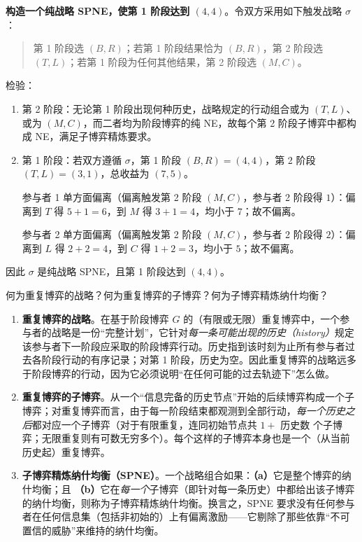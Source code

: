 \textbf{构造一个纯战略 SPNE，使第 1 阶段达到 $(4,4)$}。令双方采用如下触发战略 $\sigma$：
\begin{quote}
第 1 阶段选 $(B,R)$；若第 1 阶段结果恰为 $(B,R)$，第 2 阶段选 $(T,L)$；若第 1 阶段为任何其他结果，第 2 阶段选 $(M,C)$。
\end{quote}
检验：
\begin{enumerate}[leftmargin=*,label=(\roman*)]
  \item 第 2 阶段：无论第 1 阶段出现何种历史，战略规定的行动组合或为 $(T,L)$、或为 $(M,C)$，而二者均为阶段博弈的纯 NE，故每个第 2 阶段子博弈中都构成 NE，满足子博弈精炼要求。
  \item 第 1 阶段：若双方遵循 $\sigma$，第 1 阶段 $(B,R)=(4,4)$，第 2 阶段 $(T,L)=(3,1)$，总收益为 $(7,5)$。

  参与者 1 单方面偏离（偏离触发第 2 阶段 $(M,C)$，参与者 2 阶段得 $1$）：偏离到 $T$ 得 $5+1=6$，到 $M$ 得 $3+1=4$，均小于 $7$；故不偏离。

  参与者 2 单方面偏离（偏离触发第 2 阶段 $(M,C)$，参与者 2 阶段得 $2$）：偏离到 $L$ 得 $2+2=4$，到 $C$ 得 $1+2=3$，均小于 $5$；故不偏离。
\end{enumerate}
因此 $\sigma$ 是纯战略 SPNE，且第 1 阶段达到 $(4,4)$。


何为重复博弈的战略？何为重复博弈的子博弈？何为子博弈精炼纳什均衡？

\sol
\begin{enumerate}[leftmargin=*,label=(\roman*)]
  \item \textbf{重复博弈的战略}。在基于阶段博弈 $G$ 的（有限或无限）重复博弈中，一个参与者的战略是一份“完整计划”，它针对\textit{每一条可能出现的历史（history）}规定该参与者下一阶段应采取的阶段博弈行动。历史指到该时刻为止所有参与者过去各阶段行动的有序记录；对第 1 阶段，历史为空。因此重复博弈的战略远多于阶段博弈的行动，因为它必须说明“在任何可能的过去轨迹下”怎么做。
  \item \textbf{重复博弈的子博弈}。从一个“信息完备的历史节点”开始的后续博弈构成一个子博弈；对重复博弈而言，由于每一阶段结束都观测到全部行动，\textit{每一个历史之后}都对应一个子博弈（对于有限重复，连同初始节点共 $1+$ 历史数 个子博弈；无限重复则有可数无穷多个）。每个这样的子博弈本身也是一个（从当前历史起）重复博弈。
  \item \textbf{子博弈精炼纳什均衡（SPNE）}。一个战略组合如果：\textbf{（a）}它是整个博弈的纳什均衡；且 \textbf{（b）}它在\textit{每一个}子博弈（即针对每一条历史）中都给出该子博弈的纳什均衡，则称为子博弈精炼纳什均衡。换言之，SPNE 要求没有任何参与者在任何信息集（包括非初始的）上有偏离激励——它剔除了那些依靠“不可置信的威胁”来维持的纳什均衡。
\end{enumerate}


